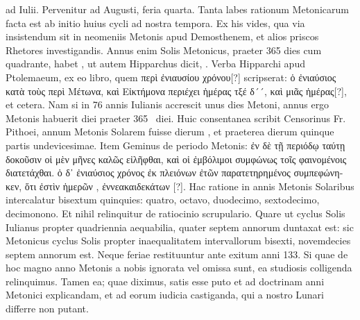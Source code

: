  ad  Iulii.
Pervenitur ad
 Augusti, feria quarta.
Tanta labes rationum Metonicarum facta
est ab initio huius cycli ad nostra tempora.
Ex his vides, qua via
insistendum sit in neomeniis Metonis apud Demosthenem, et alios
priscos Rhetores investigandis.
Annus enim Solis Metonicus, praeter
365 dies cum quadrante, habet , ut autem Hipparchus dicit,
 .
Verba
Hipparchi apud Ptolemaeum, ex eo libro, quem \textgreek{περὶ ἐνιαυσίου χρόνου[?]}
scripserat: \textgreek{ὁ ἐνιαύσιος κατὰ τοὺς περὶ Μέτωνα,
 καὶ Εἰκτήμονα περιέχει ἡμέρας
τξέ δ´´, καὶ  μιᾶς ἡμέρας[?]}, et cetera.
Nam si in 76 annis Iulianis accrescit
unus dies Metoni, annus ergo Metonis habuerit  diei praeter
 365~
diei.
Huic consentanea scribit Censorinus Fr. %
Pithoei, annum Metonis
Solarem fuisse dierum , et praeterea dierum quinque
partis undevicesimae.
Item Geminus de periodo Metonis: \textgreek{ἐν δὲ
τῇ περιόδῳ ταύτῃ δοκοῦσιν οἱ μὲν μῆνες καλῶς εἰλῆφθαι, καὶ οἱ ἐμβόλιμοι
συμφώνως τοῖς φαινομένοις διατετάχθαι. ὁ δ᾽ ἐνιαύσιος χρόνος ἐκ πλειόνων
ἐτῶν παρατετηρημένος συμπεφώνηκεν, ὅτι ἐστὶν ἡμερῶν },
 \textgreek{ἐννεακαιδεκάτων } [?].
Hac ratione in annis  Metonis Solaribus intercalatur bisextum
quinquies: quatro, octavo, duodecimo, sextodecimo, decimonono.
Et nihil relinquitur de ratiocinio scrupulario.
Quare ut cyclus
Solis Iulianus propter quadriennia aequabilia, quater septem annorum
duntaxat est: sic Metonicus cyclus Solis propter inaequalitatem
intervallorum bisexti, novemdecies septem annorum est.
Neque feriae
restituuntur ante exitum anni 133.
Si quae de hoc magno anno Metonis
a nobis ignorata vel omissa sunt, ea studiosis colligenda relinquimus.
Tamen ea; quae diximus, satis esse puto et ad doctrinam anni
Metonici explicandam, et ad eorum iudicia castiganda, qui a nostro
Lunari differre non putant.
%
